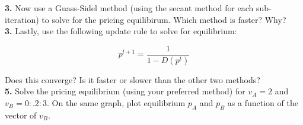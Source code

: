 \documentclass[10pt]{article}
\begin{document}
\noindent
\textbf{3.}
Now use a Guass-Sidel method (using the secant method for each sub-iteration) to solve for the pricing equilibirum. Which method is faster? Why?\\[2em]

\noindent
\textbf{3.}
Lastly, use the following update rule to solve for equilibrium:

\begin{equation}
	p^{t+1} = \frac{1}{1-D(p^t)}
\end{equation}

Does this converge? Is it faster or slower than the other two methods?\\[2em]


\noindent
\textbf{5.} Solve the pricing equilibrium (using your preferred method) for $v_A=2$ and $v_B=0:.2:3$. On the same graph, plot equilibrium $p_A$ and $p_B$ as a function of the vector of $v_B$. 
\end{document}
